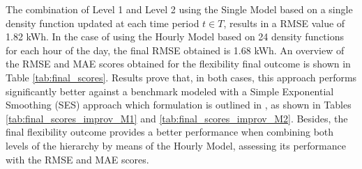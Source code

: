 The combination of Level 1 and Level 2 using the Single Model based on a single density function updated at each time period $t \in T$, results in a RMSE value of 1.82 kWh. In the case of using the Hourly Model based on 24 density functions for each hour of the day, the final RMSE obtained is 1.68 kWh. An overview of the RMSE and MAE scores obtained for the flexibility final outcome is shown in Table \ref{tab:final_scores}. Results prove that, in both cases, this approach performs significantly better against a benchmark modeled with a Simple Exponential Smoothing (SES) approach which formulation is outlined in \cite{Hyndman2021}, as shown in Tables \ref{tab:final_scores_improv_M1} and  \ref{tab:final_scores_improv_M2}. 
Besides, the final flexibility outcome provides a better performance when combining both levels of the hierarchy by means of the Hourly Model, assessing its performance with the RMSE and MAE scores. 

\begin{table}[]
\centering
\caption{Results of the final flexibility forecast outcome combining the two levels of the hierarchy. Results are for SES, and RML KDE for the Single Model and the Hourly Model.}
\label{tab:final_scores}
\end{table}
 
\begin{table}[]
\centering
\caption{Performance overview for the final flexibility outcome using Level 2 - Single Model as conditional flexibility, against the benchmark. Performance is evaluated with RMSE and MAE criteria.}
\label{tab:final_scores_improv_M1}
\end{table}


